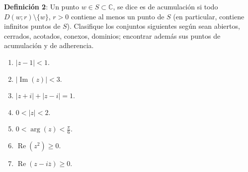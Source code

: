 \documentclass[11pt]{article}
\begin{document}
\begin{enumerate}
    \textbf{Definición 2}: Un punto $w \in S \subset \mathbb{C}$, se dice es de acumulación si todo $D(w; r) \setminus \{w\}$, $r > 0$ contiene al menos un punto de $S$ (en particular, contiene infinitos puntos de $S$). Clasifique los conjuntos siguientes según sean abiertos, cerrados, acotados, conexos, dominios; encontrar además sus puntos de acumulación y de adherencia.
    \begin{enumerate}
        \item $|z - 1| < 1$.
        \item $|\operatorname{Im}(z)| < 3$.
        \item $|z + i| + |z - i| = 1$.
        \item $0 < |z| < 2$.
        \item $0 < \arg(z) < \frac{\pi}{6}$.
        \item $\operatorname{Re}(z^2) \geq 0$.
        \item $\operatorname{Re}(z - i \overline{z}) \geq 0$.
    \end{enumerate}
\end{enumerate}
\end{document}
